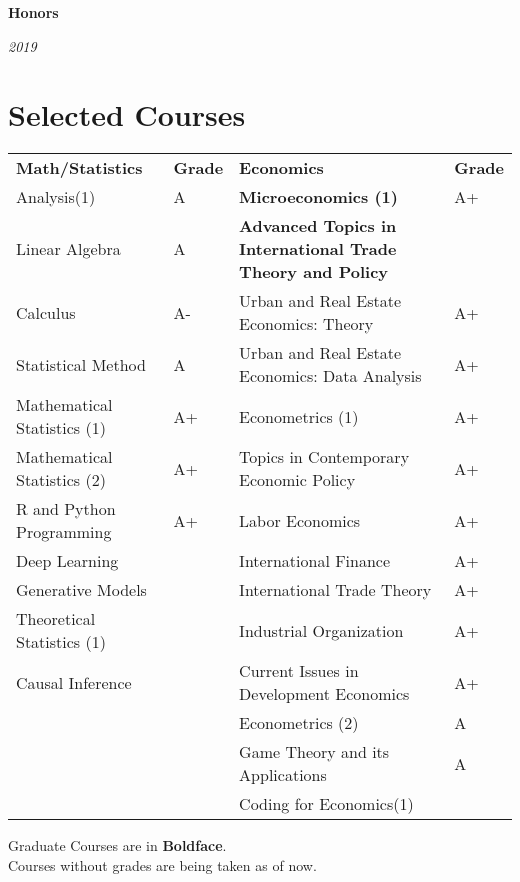 \documentclass[10pt, letterpaper]{article}
\newenvironment{twocolentry}[2][]{
	\onecolentry
	\def\secondColumn{#2}
	\setcolumnwidth{\fill, 4.5 cm}
	\begin{paracol}{2}
	}{
		\switchcolumn \raggedleft \secondColumn
	\end{paracol}
	\endonecolentry
} %
\begin{document}
\begin{twocolentry}{
		\textit{2019}    }
	\textbf{Honors}
\end{twocolentry}

\vspace{12pt}


\section{Selected Courses}
\setlength{\tabcolsep}{3pt}
\begin{tabularx}{\textwidth}{|>{\centering\arraybackslash}X|>{\centering\arraybackslash}p{1cm}|>{\centering\arraybackslash}p{7
			cm}|>{\centering\arraybackslash}p{1cm}|}
	\hline
	\textbf{Math/Statistics} & \textbf{Grade} & \textbf{Economics} & \textbf{Grade} \\
	\hhline{|=|=|=|=|}
	Analysis(1) & A & \textbf{Microeconomics (1)} &A+ \\ \hline
	Linear Algebra & A& \textbf{Advanced Topics in International Trade Theory and Policy} & \\ \hline
	Calculus&A-&Urban and Real Estate Economics: Theory&A+\\ \hline
	Statistical Method&A&Urban and Real Estate Economics: Data Analysis&A+\\ \hline
	Mathematical Statistics (1)&A+&Econometrics (1)& A+\\ \hline
	Mathematical Statistics (2)& A+& Topics in Contemporary Economic Policy & A+\\ \hline
	R and Python Programming&A+&Labor Economics&A+\\ \hline
	Deep Learning&& International Finance & A+\\ \hline
	Generative Models	&&International Trade Theory&A+\\ \hline
	Theoretical Statistics (1)	&&Industrial Organization&A+\\ \hline
	Causal Inference&&Current Issues in Development Economics&A+\\ \hline
	&&Econometrics (2)&A\\ \hline
	&&Game Theory and its Applications&A\\  \hline
	&&Coding for Economics(1)&\\ 
	
	
	\hline  

\end{tabularx}
\noindent Graduate Courses are in \textbf{Boldface}.\\
\noindent Courses without grades are being taken as of now.
	
\end{document}
